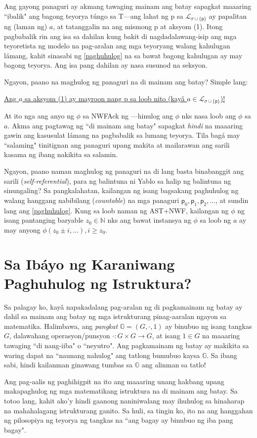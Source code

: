 \documentclass{article}
\begin{document}
Ang gayong panaguri ay akmang tawaging mainam ang batay sapagkat maaaring ``ibalik" ang bagong teyorya túngo sa \textsf{T}---ang lahat ng \textsf{p} sa $\mathcal{L}_{\sigma \cup \{\textsf{p}\}}$ ay papalitan ng (laman ng) $a$, at tatanggalin na ang mismong \textsf{p} at aksyom (1). Itong pagbabalik rin ang isa sa dahilan kung bakit di nagdadalawang-isip ang mga teyoretista ng modelo na pag-aralan ang mga teyoryang walang kahulugan lámang, kahit sinasabi ng \ref{paghuhulog} na sa bawat bagong kahulugan ay may bagong teyorya. Ang isa pang dahilan ay nasa susunod na seksyon.

Ngayon, paano na maghulog ng panaguri na di mainam ang batay? Simple lang:

\centerline{\underline{Ang $a$ sa aksyom (1) ay mayroon nang \textsf{p} sa loob nito (kayâ $a \in \mathcal{L}_{\sigma \cup \{\textsf{p}\}}$)!}}

At ito nga ang anyo ng $\phi$ sa \textsf{NWFAck} ng \cite{ast-nwf}---hinulog ang $\phi$ nks nasa loob ang $\phi$ sa $a$. Akma ang pagtawag ng ``di mainam ang batay" sapagkat \textit{hindi} na maaaring gawin ang kasusulat lámang na pagbabalik sa lumang teyorya. Tila bagá may ``salaming" tinitignan ang panaguri upang makita at mailarawan ang sarili kasama ng ibang nakikita sa salamin.

Ngayon, paano naman maghulog ng panaguri na di lang basta binabanggit ang sarili (\textit{self-referential}), para ng balintuna ni Yablo\cite{yablo} sa halip ng balintuna ng sinungaling? Sa pangkalahatan, kailangan ng isang bagsakang paghuhulog ng walang hanggang nabibilang (\textit{countable}) na mga panaguri $\textsf{p}_{0}, \textsf{p}_{1}, \textsf{p}_{2}, \ldots$, at sundin lang ang \ref{paghuhulog}. Kung sa loob naman ng \textsf{AST+NWF}, kailangan ng $\phi$ ng isang pantanging baryable $z_0\in\mathbb{N}$ nks ang bawat instansya ng $\phi$ sa loob ng $a$ ay may anyong $\phi(z_0 \pm i, \ldots), i \ge z_0.$

\section{Sa Ibáyo ng Karaniwang Paghuhulog ng Istruktura?}

Sa palagay ko, kayâ napakadalang pag-aralan ng di pagkamainam ng batay ay dahil sa mainam ang batay ng mga istrukturang pinag-aaralan ngayon sa matematika. Halimbawa, ang \textit{pangkat} $\mathbb{G} = (G, \cdot, 1)$ ay binubuo ng isang tangkas $G$, dalawahang operasyon/punsyon $\cdot:G \times G \rightarrow G$, at isang $1 \in G$ na maaaring tawaging ``di nang-iiba" o ``neyutro". Ang pagkamainam ng batay ay makikita sa waring dapat na ``naunang nahulog" ang tatlong bumubuo kaysa $\mathbb{G}$. Sa ibang sabi, hindi kailanman ginawang tumbas sa $\mathbb{G}$ ang alinman sa tatlo!

Ang pag-aalis ng paghihigpit na ito ang maaaring unang hakbang upang makapaghulog ng mga matematikang istruktura na di mainam ang batay. Sa totoo lang, kahit ako'y hindi gaanong naniniwalang may ihuhulog sa hinaharap na mahahalagang istrukturang ganito. Sa huli, sa tingin ko, ito na ang hanggahan ng pilosopiya ng teyorya ng tangkas na ``ang bagay ay binubuo ng iba pang bagay". 



\end{document}
